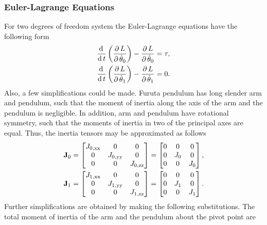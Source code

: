 \subsubsection{Euler-Lagrange Equations}
For two degrees of freedom system the Euler-Lagrange equations have the following form
\begin{subequations}\label{ELequation}
	\begin{align}
		\frac{\mathrm{d}\, }{\mathrm{d}\, t}\left( \frac{\partial\, L}{\partial\, \dot{\theta}_0} \right)-\frac{\partial\, L}{\partial\, \dot{\theta}_0} = \tau,\\
		\frac{\mathrm{d}\, }{\mathrm{d}\, t}\left( \frac{\partial\, L}{\partial\, \dot{\theta}_1} \right)-\frac{\partial\, L}{\partial\, \dot{\theta}_1} = 0.
	\end{align}
\end{subequations}
Also, a few simplifications could be made. Furuta pendulum has long slender arm and pendulum, such that the moment of inertia along the axis of the arm and the pendulum is negligible. In addition, arm and pendulum have rotational symmetry, such that the moments of inertia in two of the principal axes are equal. Thus, the inertia tensors may be approximated as follows
\begin{subequations}
	\begin{align}
	\text{\textbf{J}}_0 = 	\begin{bmatrix}
	J_{0,\text{xx}} & 0 & 0\\
	0 & J_{0,\text{yy}} & 0\\
	0 & 0 & J_{0,\text{zz}}\\
	\end{bmatrix} = \begin{bmatrix}
		0 & 0 & 0\\
	0 & J_0 & 0\\
	0 & 0 & J_0\\
	\end{bmatrix},\\
	\text{\textbf{J}}_1 = 	\begin{bmatrix}
	J_{1,\text{xx}} & 0 & 0\\
	0 & J_{1,\text{yy}} & 0\\
	0 & 0 & J_{1,\text{zz}}\\
	\end{bmatrix}= \begin{bmatrix}
	0 & 0 & 0\\
	0 & J_1 & 0\\
	0 & 0 & J_1\\
	\end{bmatrix}.
	\end{align}
\end{subequations}
Further simplifications are obtained by making the following substitutions. The total moment of inertia of the arm and the pendulum about the pivot point are

